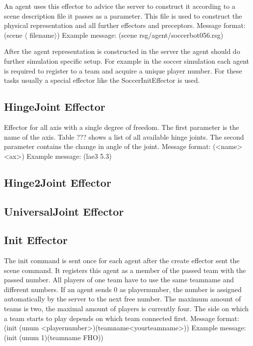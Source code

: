 An agent uses this effector to advice the server to construct it
according to a scene description file it passes as a parameter. This
file is used to construct the physical representation and all further
effectors and preceptors.\newline \newline 
Message format: (scene  $\langle$ filename$\rangle$)\newline
Example message: (scene rsg/agent/soccerbot056.rsg)

After the agent representation is constructed in the server the agent
should do further simulation specific setup. For example in the soccer
simulation each agent is required to register to a team and acquire a
unique player number. For these tasks usually a special effector like
the SoccerInitEffector is used.


\subsection{HingeJoint Effector}
Effector for all axis with a single degree of freedom.
The first parameter is the name of the axis. Table ??? shows a list of all
available hinge joints. The second parameter contains the change in angle of
the joint.\newline \newline
Message format: (<name> <ax>)\newline
Example message: (lae3 5.3)

\subsection{Hinge2Joint Effector}

\subsection{UniversalJoint Effector}


\subsection{Init Effector}
The init command is sent once for each agent after the create effector sent the
scene command. It registers this agent as a member of the passed team with the passed number.
All players of one team have to use the same teamname and different numbers.
If an agent sends 0 as playernumber, the number is assigned automatically by
the server to the next free number. The maximum amount of teams is two, the
maximal amount of players is currently four.
The side on which a team starts to play depends on which team connected
first.\newline\newline 
Message format: (init (unum <playernumber>)(teamname<yourteamname>))\newline
Example message: (init (unum 1)(teamname FHO))

